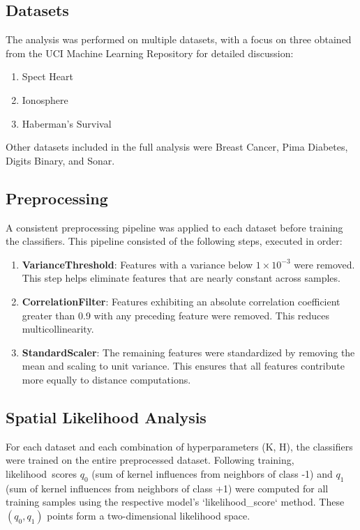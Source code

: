 \documentclass[conference]{IEEEtran}
\begin{document}
\subsection{Datasets}
The analysis was performed on multiple datasets, with a focus on three obtained from the UCI Machine Learning Repository \cite{Dua:2019} for detailed discussion:
\begin{enumerate}
    \item Spect Heart 
    \item Ionosphere 
    \item Haberman's Survival 
\end{enumerate}
Other datasets included in the full analysis were Breast Cancer, Pima Diabetes, Digits Binary, and Sonar.

\subsection{Preprocessing}
A consistent preprocessing pipeline was applied to each dataset before training the classifiers. This pipeline consisted of the following steps, executed in order:
\begin{enumerate}
    \item \textbf{VarianceThreshold}: Features with a variance below $1 \times 10^{-3}$ were removed. This step helps eliminate features that are nearly constant across samples.
    \item \textbf{CorrelationFilter}: Features exhibiting an absolute correlation coefficient greater than 0.9 with any preceding feature were removed. This reduces multicollinearity.
    \item \textbf{StandardScaler}: The remaining features were standardized by removing the mean and scaling to unit variance. This ensures that all features contribute more equally to distance computations.
\end{enumerate}

\subsection{Spatial Likelihood Analysis}
For each dataset and each combination of hyperparameters (K, H), the classifiers were trained on the entire preprocessed dataset. Following training, likelihood\ scores $q_0$ (sum of kernel influences from neighbors of class -1) and $q_1$ (sum of kernel influences from neighbors of class +1) were computed for all training samples using the respective model's `likelihood\_score` method. These $(q_0, q_1)$ points form a two-dimensional likelihood space. 
\end{document}
